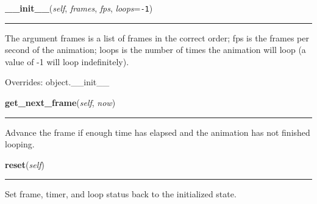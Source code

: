     \vspace{0.5ex}

\hspace{.8\funcindent}\begin{boxedminipage}{\funcwidth}

    \raggedright \textbf{\_\_init\_\_}(\textit{self}, \textit{frames}, \textit{fps}, \textit{loops}={\tt -1})

    \vspace{-1.5ex}

    \rule{\textwidth}{0.5\fboxrule}
\setlength{\parskip}{2ex}
    The argument frames is a list of frames in the correct order; fps is 
    the frames per second of the animation; loops is the number of times 
    the animation will loop (a value of -1 will loop indefinitely).

\setlength{\parskip}{1ex}
      Overrides: object.\_\_init\_\_

    \end{boxedminipage}

    \label{pygame-asteroids:tools:Anim:get_next_frame}

    \vspace{0.5ex}

\hspace{.8\funcindent}\begin{boxedminipage}{\funcwidth}

    \raggedright \textbf{get\_next\_frame}(\textit{self}, \textit{now})

    \vspace{-1.5ex}

    \rule{\textwidth}{0.5\fboxrule}
\setlength{\parskip}{2ex}
    Advance the frame if enough time has elapsed and the animation has not 
    finished looping.

\setlength{\parskip}{1ex}
    \end{boxedminipage}

    \label{pygame-asteroids:tools:Anim:reset}

    \vspace{0.5ex}

\hspace{.8\funcindent}\begin{boxedminipage}{\funcwidth}

    \raggedright \textbf{reset}(\textit{self})

    \vspace{-1.5ex}

    \rule{\textwidth}{0.5\fboxrule}
\setlength{\parskip}{2ex}
    Set frame, timer, and loop status back to the initialized state.

\setlength{\parskip}{1ex}
    \end{boxedminipage}


